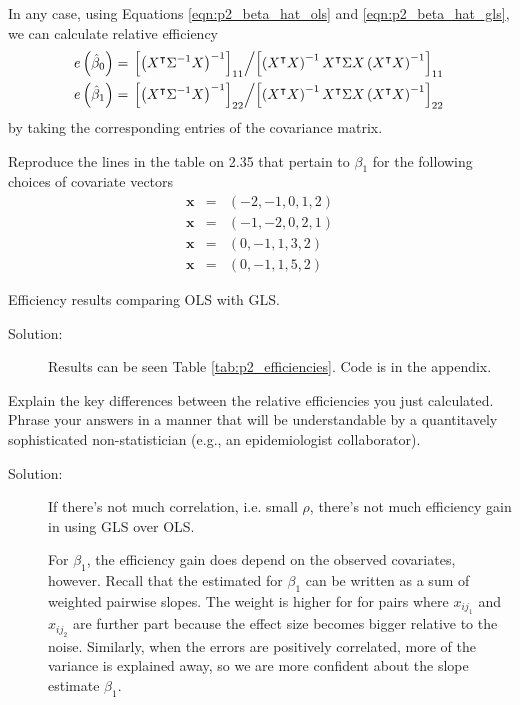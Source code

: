 \documentclass[11pt, letterpaper]{article}
\newcommand{\bx}{{\bm x}}
\newcommand{\beas}{\begin{eqnarray*}}
\newcommand{\eeas}{\end{eqnarray*}}
\begin{document}
\begin{enumerate}[(a)]
\begin{description}
  In any case, using Equations \ref{eqn:p2_beta_hat_ols} and
  \ref{eqn:p2_beta_hat_gls}, we can calculate relative efficiency
  \begin{align*}
    e\left(\hat{\beta}_0\right)
    &= \left.
      \left[\left(X^{\intercal}\Sigma^{-1}X\right)^{-1}\right]_{11}
      \middle/
      \left[\left(X^{\intercal}X\right)^{-1}X^\intercal
      \Sigma
      X\left(X^{\intercal}X\right)^{-1}\right]_{11}
      \right. \\
    e\left(\hat{\beta}_1\right)
    &= \left.
      \left[\left(X^{\intercal}\Sigma^{-1}X\right)^{-1}\right]_{22}
      \middle/
      \left[\left(X^{\intercal}X\right)^{-1}X^\intercal
      \Sigma
      X\left(X^{\intercal}X\right)^{-1}\right]_{22}
      \right.
  \end{align*}
  by taking the corresponding entries of the covariance matrix.
\end{description}
{\em \item Reproduce the lines in the table on 2.35 that pertain to $\beta_1$ for the following choices of covariate vectors
\beas
\bx&=&(-2,-1,0,1,2)\\
\bx&=&(-1,-2,0,2,1)\\
\bx&=&(0,-1,1,3,2)\\
\bx&=&(0,-1,1,5,2)
\eeas}


\begin{table}
  \scriptsize
  \centering
  
  \caption{Efficiency results comparing OLS with GLS.}
  \label{tab:p2_efficiencies}
\end{table}

\begin{description}
\item[Solution:] Results can be seen Table \ref{tab:p2_efficiencies}. Code is in the appendix.
\end{description}

{\em \item Explain the key differences between the relative efficiencies you just calculated.  Phrase your answers in a manner that will be understandable by
a quantitavely sophisticated non-statistician (e.g., an epidemiologist collaborator).
}

\begin{description}
\item[Solution:] If there's not much correlation, i.e. small $\rho$, there's not
  much efficiency gain in using GLS over OLS.

  For $\beta_1$, the efficiency gain does depend on the observed covariates,
  however. Recall that the estimated for $\beta_1$ can be written as a sum of
  weighted pairwise slopes. The weight is higher for for pairs where $x_{ij_1}$
  and $x_{ij_2}$ are further part because the effect size becomes bigger
  relative to the noise. Similarly, when the errors are positively correlated,
  more of the variance is explained away, so we are more confident about the
  slope estimate $\beta_1$.


\end{description}
\end{enumerate}
\end{document}
